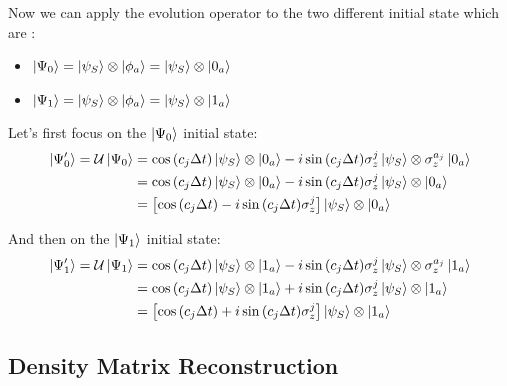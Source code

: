 \documentclass[a4paper,12pt]{article}
\begin{document}
	\newpage

	\begin{flushleft}
		Now we can apply the evolution operator to the two different initial state which are :
	\end{flushleft}

	\begin{itemize}
		\item $ \ket{\Psi_{0}} = \ket{\psi_S} \otimes \ket{\phi_a} = \ket{\psi_S} \otimes  \ket{0_a} $ \\
		\item $ \ket{\Psi_{1}} = \ket{\psi_S} \otimes \ket{\phi_a} = \ket{\psi_S} \otimes  \ket{1_a} $
		\label{eq:psi_iniz_0_1}
	\end{itemize}

	Let's first focus on the $ \ket{\Psi_{0}} $ initial state:
	\begin{align}
		\ket{\Psi'_{0}} = \mathcal{U} \ket{\Psi_{0}}
		&= \cos{\left(c_j \Delta t\right)} \ket{\psi_{S}} \otimes \ket{0_a} - i\sin{\left(c_j \Delta t \right)} \sigma_{z}^{j} \ket{\psi_{S}} \otimes \sigma_{z}^{a_j}\ket{0_a} \notag \\
		&= \cos{\left(c_j \Delta t\right)} \ket{\psi_{S}} \otimes \ket{0_a} - i\sin{\left(c_j \Delta t \right)} \sigma_{z}^{j} \ket{\psi_{S}} \otimes \ket{0_a} \notag \\
		&= \left[\cos{\left(c_j \Delta t\right)} - i\sin{\left(c_j \Delta t \right)} \sigma_{z}^{j} \right] \ket{\psi_{S}} \otimes \ket{0_a}
		\label{eq:psi_0_evo}
	\end{align}

	And then on the $ \ket{\Psi_{1}} $ initial state:
	\begin{align}
		\ket{\Psi'_{1}} = \mathcal{U} \ket{\Psi_{1}}
		&= \cos{\left(c_j \Delta t\right)} \ket{\psi_{S}} \otimes \ket{1_a} - i\sin{\left(c_j \Delta t \right)} \sigma_{z}^{j} \ket{\psi_{S}} \otimes \sigma_{z}^{a_j}\ket{1_a} \notag \\
		&= \cos{\left(c_j \Delta t\right)} \ket{\psi_{S}} \otimes \ket{1_a} + i\sin{\left(c_j \Delta t \right)} \sigma_{z}^{j} \ket{\psi_{S}} \otimes \ket{1_a} \notag \\
		&= \left[\cos{\left(c_j \Delta t\right)} + i\sin{\left(c_j \Delta t \right)} \sigma_{z}^{j} \right] \ket{\psi_{S}} \otimes \ket{1_a}
		\label{eq:psi_1_evo}
	\end{align}

	\subsection{Density Matrix Reconstruction}
	\label{sub:Density_Matrix_Reconstruction_Diff}
\end{document}

